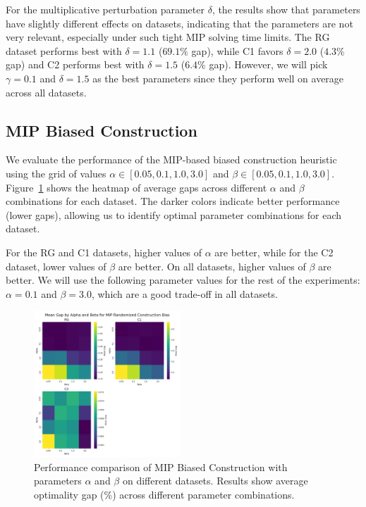 For the multiplicative perturbation parameter $\delta$, the results show that parameters have slightly different effects on datasets, indicating that the parameters are not very relevant, especially under such tight MIP solving time limits. The RG dataset performs best with $\delta = 1.1$ ($69.1\%$ gap), while C1 favors $\delta = 2.0$ ($4.3\%$ gap) and C2 performs best with $\delta = 1.5$ ($6.4\%$ gap). However, we will pick $\gamma = 0.1$ and $\delta = 1.5$ as the best parameters since they perform well on average across all datasets.


\subsection{MIP Biased Construction}

We evaluate the performance of the MIP-based biased construction heuristic
using the grid of values $\alpha \in [0.05, 0.1, 1.0, 3.0]$ and $\beta \in [0.05, 0.1, 1.0, 3.0]$.
Figure~\ref{fig:alpha_beta_grid_mip_randomized_construction_bias} shows the heatmap of average gaps across different $\alpha$ and $\beta$ combinations for each dataset.
The darker colors indicate better performance (lower gaps), allowing us to identify optimal parameter combinations for each dataset. 

For the RG and C1 datasets, higher values of $\alpha$ are better, while for the C2 dataset, lower values of $\beta$ are better. On all datasets, higher values of $\beta$ are better.
We will use the following parameter values for the rest of the experiments: $\alpha = 0.1$ and $\beta = 3.0$, which are a good trade-off in all datasets.

\begin{figure}[h]
    \centering
    \includegraphics[width=0.49\textwidth]{figures/alpha_beta_grid_mip_randomized_construction_bias.png}
    \caption{Performance comparison of MIP Biased Construction with parameters $\alpha$ and $\beta$ on different datasets. Results show average optimality gap (\%) across different parameter combinations.}
    \label{fig:alpha_beta_grid_mip_randomized_construction_bias} 
\end{figure} 

